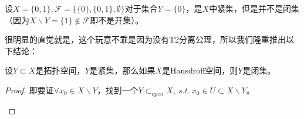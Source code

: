 \documentclass[lang=cn,10pt,device=pad]{elegantbook}
\newcommand{\tp}{\mathscr{F}}
\newcommand{\st}{~s.t.~}
\newcommand{\dkh}[1]{\{#1\}}
\newcommand{\chadiao}{\backslash}
\begin{document}
\begin{example}[一般拓扑空间中的紧集不一定是闭集]
	设$X=\dkh{0,1},\tp = \dkh{\dkh{0},\dkh{0,1},\emptyset}$对于集合$Y = \dkh{0}$，是$X$中紧集，但是并不是闭集（因为$X\chadiao Y = \dkh{1}\notin \tp$即不是开集）。
\end{example}
很明显的直觉就是，这个玩意不乖是因为没有T2分离公理，所以我们隆重推出以下结论：
\begin{proposition}[Hausdroff空间中的紧集必然是闭集]
	设$Y\subset X$是拓扑空间，$Y$是紧集，那么如果$X$是Hausdroff空间，则$Y$是闭集。
\end{proposition}
\begin{proof}
	即要证$\forall x_{0}\in  X\chadiao Y$，找到一个$Y\subset_{open}X , \st x_{0}\in U\subset X\chadiao Y$。
	
	\begin{figure}[h]
		\centering



\begin{tikzpicture}[x=0.75pt,y=0.75pt,yscale=-1,xscale=1]


\end{tikzpicture}
\end{figure}
\end{proof}
\end{document}
